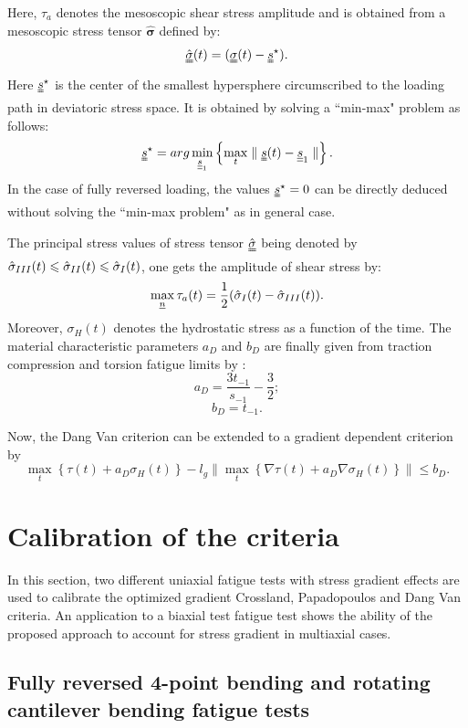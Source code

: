 Here, $\tau_a$ denotes the mesoscopic shear stress amplitude and is obtained from a mesoscopic stress tensor $\hat{\bm{\sigma}}$ defined by:
$$\hat{\uuline{\sigma}}(t)=(\uuline{\sigma}(t)-\uuline{s}^\star).$$
Here $\uuline{s}^\star$ is the center of the smallest hypersphere circumscribed to the loading path in deviatoric stress space. It is obtained by solving a ``min-max" problem as follows:
$$\uuline{s}^\star = arg \min\limits_{\underline{\underline{s}}_1}\left\{\max\limits_t\parallel \uuline{s}(t)-\underline{\underline{s}}_1\parallel\right\}.$$
In the case of fully reversed loading, the values $\uuline{s}^\star=0$ can be directly deduced without solving the ``min-max problem" as in general case.

The principal stress values of stress tensor $\uuline{\hat{\sigma}}$ being denoted by $\hat{\sigma}_{\Rmnum{3}}(t)\leqslant\hat{\sigma}_{\Rmnum{2}}(t)\leqslant\hat{\sigma}_{\Rmnum{1}}(t)$, one gets the amplitude of shear stress by:
$$\max \limits_{\underline{n}}\tau_a(t)=\frac{1}{2}(\hat{\sigma}_{\Rmnum{1}}(t)-\hat{\sigma}_{\Rmnum{3}}(t)).$$
Moreover, $\sigma_H(t)$ denotes  the hydrostatic stress as a function of the time.
The material characteristic parameters $a_D$ and $b_D$ are finally  given from traction compression and torsion fatigue limits by  :
$$a_D=\dfrac{3t_{-1}}{s_{-1}}-\dfrac{3}{2};$$  $$b_D=t_{-1}.$$

Now,  the Dang Van criterion can be extended to a gradient dependent criterion by 
\begin{equation}
	\max \limits_{t}\left\{\tau{(t)}+a_D\sigma_H(t)\right\}-l_g\parallel	\max \limits_{t}\left\{{\nabla\tau{(t)}}+a_D\nabla\sigma_H(t)\right\}\parallel\leqslant b_D.
	\label{modified dangvan}
\end{equation}
\section{Calibration of the criteria}

In this section, two different uniaxial fatigue tests with stress gradient effects are used to calibrate the optimized gradient Crossland, Papadopoulos and Dang Van criteria. An application to a biaxial test fatigue test shows the ability of the proposed approach to account for stress gradient in multiaxial cases. 


\subsection{Fully reversed 4-point bending and rotating cantilever bending fatigue tests}
